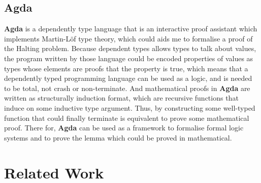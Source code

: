 \subsection{Agda}
\textbf{Agda} is a dependently type language\cite{norell_dependently_2009} that is an interactive proof assistant which
implements Martin-Löf type theory\cite{van_oosten_homotopy_2014}, which could aids me to formalise a proof of the Halting problem. 
Because dependent types allows types to talk about values, the program written by those language could be encoded properties of values as types whose elements are proofs that the
property is true, which means that a dependently typed programming language can be used as a logic, and is needed to be total, not crash or non-terminate.
And mathematical proofs in \textbf{Agda} are written as structurally induction format, which are recursive functions that induce on some inductive type argument.
Thus, by constructing some well-typed function that could finally terminate is equivalent to prove some mathematical proof.
There for, \textbf{Agda} can be used as a framework to formalise formal logic systems and to prove the lemma which could be proved in mathematical.

\section{Related Work}
